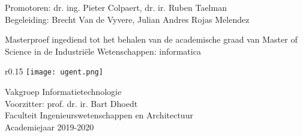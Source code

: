 \begin{titlepage}
{\ugentfont

  \vspace*{0.37\textheight}

  \begin{huge}

    \thetitle

    \theauthor

  \end{huge}

  \vspace{2.8cm}

  \begin{Large}
    Promotoren: dr. ing. Pieter Colpaert, dr. ir. Ruben Taelman\\
    Begeleiding: Brecht Van de Vyvere, Julian Andres Rojas Melendez

    Masterproef ingediend tot het behalen van de academische graad van Master of Science in de Industriële Wetenschappen: informatica
  \end{Large}

  \vspace{1cm}

  \begin{Large}
    \begin{wrapfigure}{r}{0.15\textwidth}
      \texttt{[image: ugent.png]}
    \end{wrapfigure}

    Vakgroep Informatietechnologie\\
    Voorzitter: prof. dr. ir. Bart Dhoedt\\
    Faculteit Ingenieurswetenschappen en Architectuur\\
    Academiejaar 2019-2020
  \end{Large}
}
\end{titlepage}
